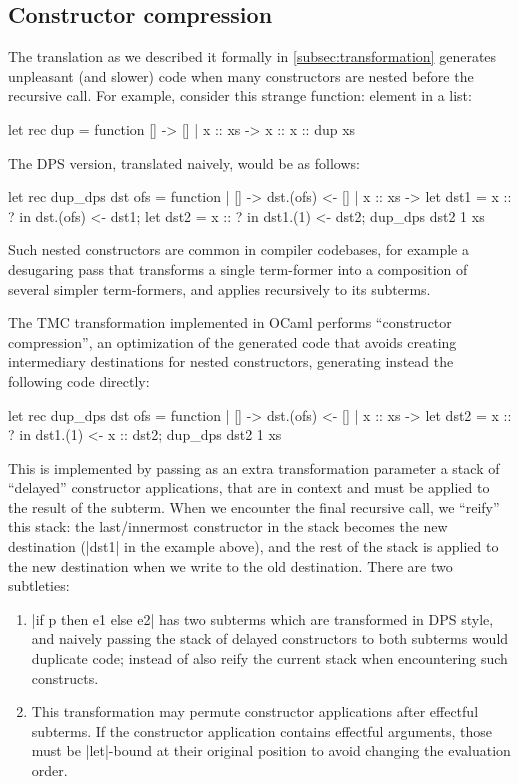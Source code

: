 \subsection{Constructor compression} \label{subsec:constructor-compression} The translation as we described it formally in \cref{subsec:transformation} generates unpleasant (and slower) code when many constructors are nested before the recursive call. For example, consider this strange function: element in a list:
\begin{Ocaml}
let rec dup = function [] -> [] | x :: xs -> x :: x :: dup xs
\end{Ocaml}
The DPS version, translated naively, would be as follows:
\begin{Ocaml}
let rec dup_dps dst ofs = function
| [] -> dst.(ofs) <- []
| x :: xs ->
  let dst1 = x :: ? in
  dst.(ofs) <- dst1;
  let dst2 = x :: ? in
  dst1.(1) <- dst2;
  dup_dps dst2 1 xs
\end{Ocaml}
Such nested constructors are common in compiler codebases, for
example a desugaring pass that transforms a single term-former into
a composition of several simpler term-formers, and applies recursively to
its subterms.

The TMC transformation implemented in OCaml performs ``constructor compression'', an optimization of the generated code that avoids creating intermediary destinations for nested constructors, generating instead the following code directly:
\begin{Ocaml}
let rec dup_dps dst ofs = function
| [] -> dst.(ofs) <- []
| x :: xs ->
  let dst2 = x :: ? in
  dst1.(1) <- x :: dst2;
  dup_dps dst2 1 xs
\end{Ocaml}

This is implemented by passing as an extra transformation parameter a stack of ``delayed'' constructor applications, that are in context and must be applied to the result of the subterm. When we encounter the final recursive call, we ``reify'' this stack: the last/innermost constructor in the stack becomes the new destination (\ocaml|dst1| in the example above), and the rest of the stack is applied to the new destination when we write to the old destination. There are two subtleties:
\begin{enumerate}
\item \ocaml|if p then e1 else e2| has two subterms which are transformed in DPS style, and naively passing the stack of delayed constructors to both subterms would duplicate code; instead of also reify the current stack when encountering such constructs.
\item This transformation may permute constructor applications after effectful subterms. If the constructor application contains effectful arguments, those must be \ocaml|let|-bound at their original position to avoid changing the evaluation order.
\end{enumerate}

